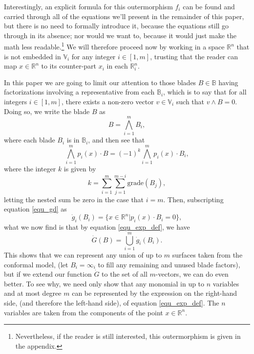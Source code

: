 \documentclass{birkjour}
\theoremstyle{definition}
\theoremstyle{remark}
\numberwithin{equation}{section}
\newcommand{\R}{\mathbb{R}}
\newcommand{\B}{\mathbb{B}}
\newcommand{\V}{\mathbb{V}}
\newcommand{\gd}{\dot{g}}
\newcommand{\Gd}{\dot{G}}
\newcommand{\nvai}{\infty}
\newcommand{\grade}{\mbox{grade}}
\begin{document}
Interestingly, an explicit formula for this outermorphism $f_i$ can be found and carried through
all of the equations we'll present in the remainder of this paper, but there is no need to
formally introduce it, because the equations still go through in its absence; nor would we want to,
because it would just make the math less readable.\footnote{Nevertheless,
if the reader is still
interested, this outermorphism is given in the appendix.}  We will therefore
proceed now by working in a space $\R^n$ that is not
embedded in $\V_i$ for any integer $i\in[1,m]$, trusting that the
reader can map $x\in\R^n$ to its counter-part $x_i$ in each $\R_i^n$.

In this paper we are going to limit our attention
to those blades $B\in\B$ having factorizations involving a representative from each $\B_i$,
which is to say that for all integers $i\in[1,m]$, there exists a non-zero vector $v\in\V_i$ such that $v\wedge B=0$.
Doing so, we write the blade $B$ as
\begin{equation}\label{equ_B_factored}
B = \bigwedge_{i=1}^m B_i,
\end{equation}
where each blade $B_i$ is in $\B_i$, and then see that
\begin{equation}\label{equ_exp_def}
\bigwedge_{i=1}^m p_i(x)\cdot B = (-1)^k\bigwedge_{i=1}^m p_i(x)\cdot B_i,
\end{equation}
where the integer $k$ is given by
\begin{equation}\label{equ_k}
k=\sum_{i=1}^m\sum_{j=1}^{m-i}\grade(B_j),
\end{equation}
letting the nested sum be zero in the case that $i=m$.
Then, subscripting equation \eqref{equ_gd} as
\begin{equation*}
\gd_i(B_i) = \{x\in\R^n|p_i(x)\cdot B_i=0\},
\end{equation*}
what we now find is that by equation \eqref{equ_exp_def}, we have
\begin{equation*}
\Gd(B) = \bigcup_{i=1}^m\gd_i(B_i).
\end{equation*}
This shows that we can represent any union of up to $m$ surfaces taken from the conformal model,
(let $B_i=\nvai_i$ to fill any remaining and unused blade factors),
but if we extend our function $\Gd$ to the set of all $m$-vectors, we can do even better.
To see why, we need only show that any monomial in up to $n$ variables and at most
degree $m$ can be represented by the expression on the right-hand side, (and therefore
the left-hand side), of equation \eqref{equ_exp_def}.
The $n$ variables are taken from the components of the point $x\in\R^n$.
\end{document}

